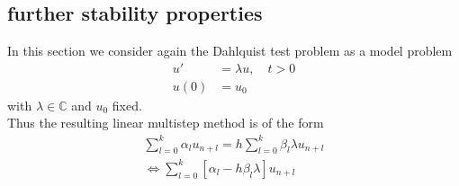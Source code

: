 	
	
	
	
	\subsection{further stability properties}
	
	In this section we consider again the Dahlquist test problem as a model problem
	\begin{align}
		u' &= \lambda u, \quad t > 0 \\
		u(0) &= u_0
	\end{align}
	with $\lambda \in \mathbb{C}$ and $u_0$ fixed.\\
	
	
	Thus the resulting linear multistep method is of the form
	\begin{align*}
		\sum_{l=0}^{k} \alpha_l u_{n+l} = h \sum_{l=0}^{k} \beta_l \lambda u_{n+l} \\
		\iff \sum_{l=0}^{k}  [\alpha_l - h \beta_l \lambda] u_{n+l}
	\end{align*}
	
	
